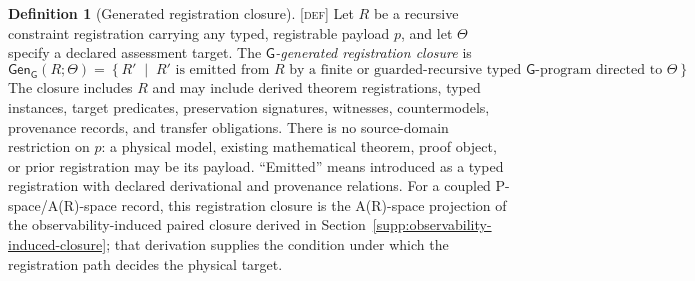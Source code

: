 \documentclass[11pt]{article}
\newcommand{\GOp}{\ensuremath{\mathsf{G}}}
\newcommand{\GenClos}{\ensuremath{\mathsf{Gen}_{\GOp}}}
\newcommand{\Defn}{\textsc{[def]}}
\theoremstyle{definition}
\newtheorem{sdefinition}{Definition}
\begin{document}
\begin{sdefinition}[Generated registration closure]
\label{def:generated-registration-closure}
\Defn{} Let $R$ be a recursive constraint registration carrying any typed,
registrable payload $p$, and let $\Theta$ specify a declared assessment target.
The \emph{$\GOp$-generated registration closure} is
\begin{equation}
\GenClos(R;\Theta)=
\left\{R'\;\middle|\;R'\text{ is emitted from }R\text{ by a finite or
 guarded-recursive typed }\GOp\text{-program directed to }\Theta\right\}.
\label{eq:generated-registration-closure}
\end{equation}
The closure includes $R$ and may include derived theorem registrations, typed
instances, target predicates, preservation signatures, witnesses, countermodels,
provenance records, and transfer obligations. There is no source-domain restriction
on $p$: a physical model, existing mathematical theorem, proof object, or prior
registration may be its payload. ``Emitted'' means introduced as a typed
registration with declared derivational and provenance relations. For a coupled
P-space/A(R)-space record, this registration closure is the A(R)-space projection
of the observability-induced paired closure derived in
Section~\ref{supp:observability-induced-closure}; that derivation supplies the
condition under which the registration path decides the physical target.
\end{sdefinition}
\end{document}
